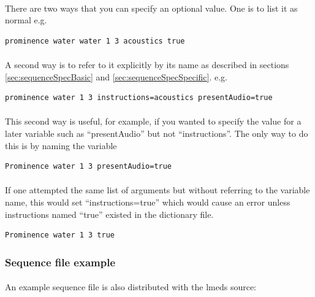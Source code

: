 \documentclass[12pt, oneside]{scrbook}   	%
\begin{document}
\paragraph{}
There are two ways that you can specify an optional value.  One is to list it as normal e.g.

\begin{lstlisting}
prominence water water 1 3 acoustics true
\end{lstlisting}

\paragraph{}
A second way is to refer to it explicitly by its name as described in sections \ref{sec:sequenceSpecBasic} and \ref{sec:sequenceSpecSpecific}. e.g.

\begin{lstlisting}
prominence water 1 3 instructions=acoustics presentAudio=true
\end{lstlisting}

\paragraph{}
This second way is useful, for example, if you wanted to specify the value for a later variable such as ``presentAudio'' but not ``instructions''.  The only way to do this is by naming the variable 

\begin{lstlisting}
Prominence water 1 3 presentAudio=true
\end{lstlisting}

\paragraph{}
If one attempted the same list of arguments but without referring to the variable name, this would set ``instructions=true'' which would cause an error unless instructions named ``true'' existed in the dictionary file.

\begin{lstlisting}
Prominence water 1 3 true
\end{lstlisting}


\subsubsection{Sequence file example}
\label{sec:sequenceFileExample}

\paragraph{}
An example sequence file is also distributed with the lmeds source:
\end{document}
